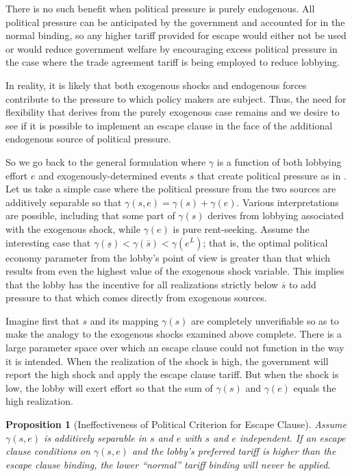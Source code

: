 \documentclass[12pt]{article}
\newtheorem{proposition}{Proposition}
\newcommand{\ov}{\overline}
\newcommand{\un}{\underline}
\newcommand{\ga}{\gamma}
\begin{document}
There is no such benefit when political pressure is purely endogenous. All political pressure can be anticipated by the government and accounted for in the normal binding, so any higher tariff provided for escape would either not be used or would reduce government welfare by encouraging excess political pressure in the case where the trade agreement tariff is being employed to reduce lobbying.

In reality, it is likely that both exogenous shocks and endogenous forces contribute to the pressure to which policy makers are subject. Thus, the need for flexibility that derives from the purely exogenous case remains and we desire to see if it is possible to implement an escape clause in the face of the additional endogenous source of political pressure.

So we go back to the general formulation where $\ga$ is a function of both lobbying effort $e$ and exogenously-determined events $s$ that create political pressure as in \Textcite{ms2011}. Let us take a simple case where the political pressure from the two sources are additively separable so that $\ga(s,e) = \ga(s) + \ga(e)$. Various interpretations are possible, including that some part of $\ga(s)$ derives from lobbying associated with the exogenous shock, while $\ga(e)$ is pure rent-seeking. Assume the interesting case that $\ga(\un{s}) < \ga(\ov{s}) < \ga(e^L)$; that is, the optimal political economy parameter from the lobby's point of view is greater than that which results from even the highest value of the exogenous shock variable. This implies that the lobby has the incentive for all realizations strictly below $\ov{s}$ to add pressure to that which comes directly from exogenous sources.

Imagine first that $s$ and its mapping $\ga(s)$ are completely unverifiable so as to make the analogy to the exogenous shocks examined above complete. There is a large parameter space over which an escape clause could not function in the way it is intended. When the realization of the shock is high, the government will report the high shock and apply the escape clause tariff. But when the shock is low, the lobby will exert effort so that the sum of $\ga(s)$ and $\ga(e)$ equals the high realization.

\begin{proposition}[Ineffectiveness of Political Criterion for Escape Clause]
    Assume $\ga(s,e)$ is additively separable in $s$ and $e$ with $s$ and $e$ independent. If an escape clause conditions on $\ga(s,e)$ and the lobby's preferred tariff is higher than the escape clause binding, the lower ``normal'' tariff binding will never be applied.
\end{proposition}
\end{document}
